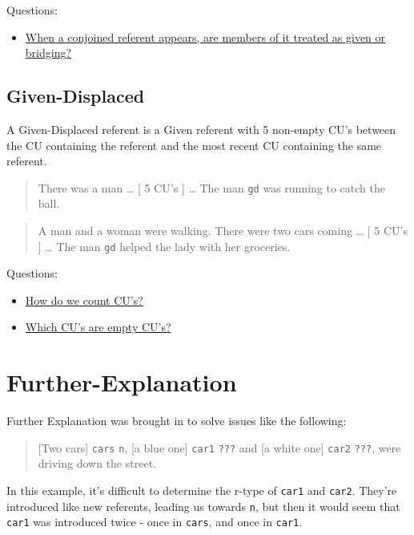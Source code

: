 \documentclass[
]{book}
\providecommand{\tightlist}{%
  \setlength{\itemsep}{0pt}\setlength{\parskip}{0pt}}
\begin{document}
Questions:

\begin{itemize}
\tightlist
\item
  \protect\hyperlink{conjoined-referent-members}{When a conjoined referent appears, are members of it treated as given or bridging?}
\end{itemize}

\hypertarget{given-displaced}{%
\subsection{Given-Displaced}\label{given-displaced}}

A Given-Displaced referent is a Given referent with 5 non-empty CU's between the CU containing the referent and the most recent CU containing the same referent.

\begin{quote}
There was a man \ldots{}
{[} 5 CU's {]} \ldots{}
The man \texttt{gd} was running to catch the ball.
\end{quote}

\begin{quote}
A man and a woman were walking.
There were two cars coming \ldots{}
{[} 5 CU's {]} \ldots{}
The man \texttt{gd} helped the lady with her groceries.
\end{quote}

Questions:

\begin{itemize}
\tightlist
\item
  \protect\hyperlink{counting-cus}{How do we count CU's?}
\item
  \protect\hyperlink{empty-cus}{Which CU's are empty CU's?}
\end{itemize}

\hypertarget{further-explanation}{%
\section{Further-Explanation}\label{further-explanation}}

Further Explanation was brought in to solve issues like the following:

\begin{quote}
{[}Two cars{]} \texttt{cars} \texttt{n}, {[}a blue one{]} \texttt{car1} \texttt{???} and {[}a white one{]} \texttt{car2} \texttt{???}, were driving down the street.
\end{quote}

In this example, it's difficult to determine the r-type of \texttt{car1} and \texttt{car2}.
They're introduced like new referents, leading us towards \texttt{n}, but then it would seem that \texttt{car1} was introduced twice -
once in \texttt{cars}, and once in \texttt{car1}.
\end{document}
